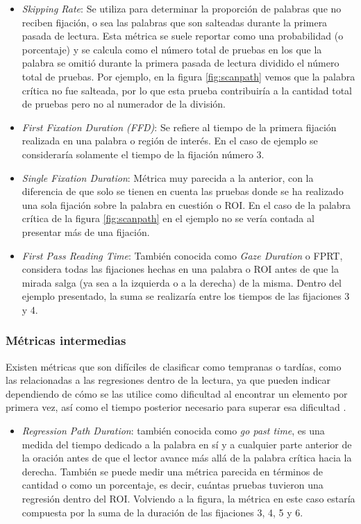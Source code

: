 \begin{itemize}
    \item \textit{Skipping Rate}: Se utiliza para determinar la proporción de palabras que no reciben fijación, o sea las palabras que son salteadas durante la primera pasada de lectura. Esta métrica se suele reportar como una probabilidad (o porcentaje) y se calcula como el número total de pruebas en los que la palabra se omitió durante la primera pasada de lectura dividido el número total de pruebas. Por ejemplo, en la figura \ref{fig:scanpath} vemos que la palabra crítica no fue salteada, por lo que esta prueba contribuiría a la cantidad total de pruebas pero no al numerador de la división.
    \item \textit{First Fixation Duration (FFD)}: Se refiere al tiempo de la primera fijación realizada en una palabra o región de interés. En el caso de ejemplo se consideraría solamente el tiempo de la fijación número 3.
    \item \textit{Single Fixation Duration}: Métrica muy parecida a la anterior, con la diferencia de que solo se tienen en cuenta las pruebas donde se ha realizado una sola fijación sobre la palabra en cuestión o ROI. En el caso de la palabra crítica de la figura \ref{fig:scanpath} en el ejemplo no se vería contada al presentar más de una fijación.
    \item \textit{First Pass Reading Time}: También conocida como \textit{Gaze Duration} o FPRT, considera todas las fijaciones hechas en una palabra o ROI antes de que la mirada salga (ya sea a la izquierda o a la derecha) de la misma. Dentro del ejemplo presentado, la suma se realizaría entre los tiempos de las fijaciones 3 y 4.
\end{itemize}

\subsubsection{Métricas intermedias}

Existen métricas que son difíciles de clasificar como tempranas o tardías, como las relacionadas a las regresiones dentro de la lectura, ya que pueden indicar dependiendo de cómo se las utilice como dificultad al encontrar un elemento por primera vez, así como el tiempo posterior necesario para superar esa dificultad \parencite{CliftonStaubRayner2007}.

\begin{itemize}
    \item \textit{Regression Path Duration}: también conocida como \textit{go past time}, es una medida del tiempo dedicado a la palabra en sí y a cualquier parte anterior de la oración antes de que el lector avance más allá de la palabra crítica hacia la derecha. También se puede medir una métrica parecida en términos de cantidad o como un porcentaje, es decir, cuántas pruebas tuvieron una regresión dentro del ROI. Volviendo a la figura, la métrica en este caso estaría compuesta por la suma de la duración de las fijaciones 3, 4, 5 y 6.
\end{itemize}

